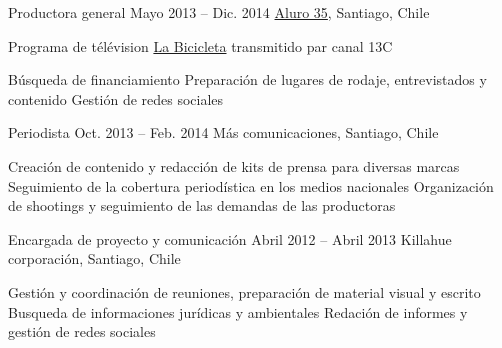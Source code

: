 \begin{joblist}
{{\begin{itemize}
			\end{itemize}     
        }
	}
    
    
    
\item[Productora general]{Mayo 2013 -- Dic. 2014}
     {     
     \href{https://www.aluro35.com/}  {Aluro 35}, Santiago, Chile
     }
     {Programa de télévision \href{http://www.13.cl/c/programas/la-bicicleta}{La Bicicleta} transmitido par canal 13C \\
		\normalsize{
		\iftbftiny \vspace{-0.5cm} \fi
			\begin{itemize}
			  \iftbftiny \setlength\itemsep{-3pt} \fi
			  \cvitem[\checkmark] Búsqueda de financiamiento                
			  \cvitem[\checkmark] Preparación de lugares de rodaje, entrevistados y contenido
			  \cvitem[\checkmark] Gestión de redes sociales      
			\end{itemize}     
        }
	}



\item[Periodista]{Oct. 2013 -- Feb. 2014 }     
  	{
  	Más comunicaciones, Santiago, Chile
  	}     
  	{
		\normalsize{
		\iftbftiny \vspace{-0.5cm} \fi
		\begin{itemize}
			  \iftbftiny \setlength\itemsep{-3pt} \fi
			  \cvitem[\checkmark]  Creación de contenido y redacción de kits de prensa para diversas marcas                                       
			  \cvitem[\checkmark]  Seguimiento de la cobertura periodística en los medios nacionales                                          
			  \cvitem[\checkmark]  Organización de shootings y seguimiento de las demandas de las productoras

		\end{itemize}       
        }
	}

\item[Encargada de proyecto y comunicación]{Abril 2012 -- Abril 2013 \vspace{0.2cm}}     
  	{
  	Killahue corporación, Santiago, Chile
  	}     
  	{
       
        \normalsize{
		\iftbftiny \vspace{-0.5cm} \fi
		\begin{itemize}
			  \iftbftiny \setlength\itemsep{-3pt} \fi
			  \cvitem[\checkmark] Gestión y coordinación de reuniones, preparación de material visual y escrito                                   
			  \cvitem[\checkmark] Busqueda de informaciones jurídicas y ambientales
			  \cvitem[\checkmark] Redación de informes y gestión de redes sociales                                       
		\end{itemize}  
		}
	}


   

\end{joblist}


